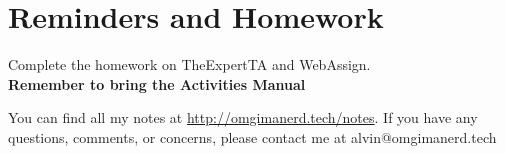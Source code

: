 \documentclass[letterpaper, 12pt]{math}
\begin{document}
\section*{Reminders and Homework}
Complete the homework on TheExpertTA and WebAssign. \\
\textbf{Remember to bring the Activities Manual}

\begin{center}
  You can find all my notes at \url{http://omgimanerd.tech/notes}. If you have
  any questions, comments, or concerns, please contact me at
  alvin@omgimanerd.tech
\end{center}
\end{document}
